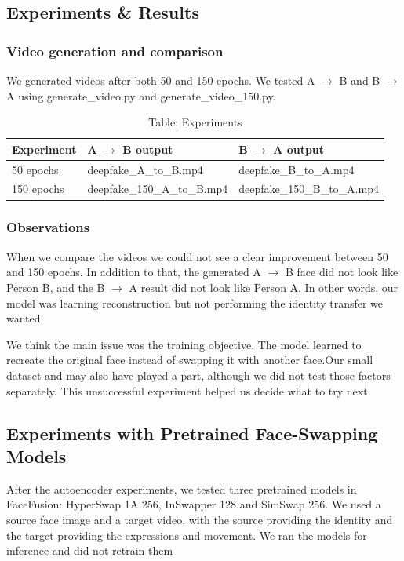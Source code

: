 \subsection{Experiments \& Results}
\subsubsection{Video generation and comparison}
We generated videos after both 50 and 150 epochs. We tested A $\rightarrow$ B and B $\rightarrow$ A using generate\_video.py and generate\_video\_150.py.

\begin{table}[tb]
  \centering
  \footnotesize
  \begin{tabular}{@{}l l l@{}}
    \toprule
    Experiment & A $\rightarrow$ B output & B $\rightarrow$ A output \\
    \midrule
    50 epochs & deepfake\_A\_to\_B.mp4 & deepfake\_B\_to\_A.mp4 \\
    150 epochs & deepfake\_150\_A\_to\_B.mp4 & deepfake\_150\_B\_to\_A.mp4 \\
    \bottomrule
  \end{tabular}
  \caption*{Table: Experiments}
\end{table}

\subsubsection{Observations}
When we compare the videos we could not see a clear improvement between 50 and 150 epochs. In addition to that, the generated A $\rightarrow$ B face did not look like Person B, and the B $\rightarrow$ A result did not look like Person A. In other words, our model was learning reconstruction but not performing the identity transfer we wanted.

We think the main issue was the training objective. The model learned to recreate the original face instead of swapping it with another face.Our small dataset and may also have played a part, although we did not test those factors separately. This unsuccessful experiment helped us decide what to try next.

\subsection{Experiments with Pretrained Face-Swapping Models}
After the autoencoder experiments, we tested three pretrained models in FaceFusion: HyperSwap 1A 256, InSwapper 128 and SimSwap 256. We used a source face image and a target video, with the source providing the identity and the target providing the expressions and movement. We ran the models for inference and did not retrain them

